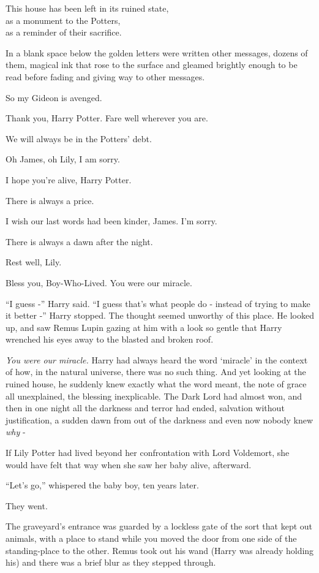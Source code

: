 This house has been left in its ruined state,\\ as a monument to the
Potters,\\ as a reminder of their sacrifice.

In a blank space below the golden letters were written other messages,
dozens of them, magical ink that rose to the surface and gleamed
brightly enough to be read before fading and giving way to other
messages.

So my Gideon is avenged.

Thank you, Harry Potter. Fare well wherever you are.

We will always be in the Potters' debt.

Oh James, oh Lily, I am sorry.

I hope you're alive, Harry Potter.

There is always a price.

I wish our last words had been kinder, James. I'm sorry.

There is always a dawn after the night.

Rest well, Lily.

Bless you, Boy-Who-Lived. You were our miracle.

``I guess -'' Harry said. ``I guess that's what people do - instead of
trying to make it better -'' Harry stopped. The thought seemed unworthy
of this place. He looked up, and saw Remus Lupin gazing at him with a
look so gentle that Harry wrenched his eyes away to the blasted and
broken roof.

\emph{You were our miracle.} Harry had always heard the word `miracle'
in the context of how, in the natural universe, there was no such thing.
And yet looking at the ruined house, he suddenly knew exactly what the
word meant, the note of grace all unexplained, the blessing
inexplicable. The Dark Lord had almost won, and then in one night all
the darkness and terror had ended, salvation without justification, a
sudden dawn from out of the darkness and even now nobody knew \emph{why}
-

If Lily Potter had lived beyond her confrontation with Lord Voldemort,
she would have felt that way when she saw her baby alive, afterward.

``Let's go,'' whispered the baby boy, ten years later.

They went.

The graveyard's entrance was guarded by a lockless gate of the sort that
kept out animals, with a place to stand while you moved the door from
one side of the standing-place to the other. Remus took out his wand
(Harry was already holding his) and there was a brief blur as they
stepped through.

